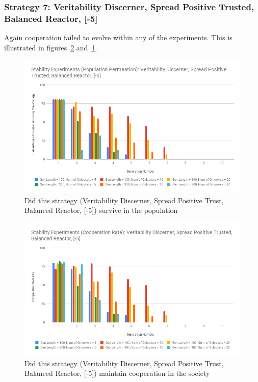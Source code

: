 \documentclass[]{final_report}
\begin{document}
\subsubsection{Strategy 7: Veritability Discerner, Spread Positive Trusted, Balanced Reactor, [-5]} 
Again cooperation failed to evolve within any of the experiments. This is illustrated in figures~\ref{fig:vdsptbr-5Coop} and~\ref{fig:vdsptbr-5Pop}.
\begin{figure}
\begin{framed}
	\includegraphics[width=\textwidth]{vdsptbr-5Pop.png}
	\caption{Did this strategy (Veritability Discerner, Spread Positive Trust, Balanced Reactor, [-5]) survive in the population}
	\label{fig:vdsptbr-5Pop}
\end{framed}
\end{figure}
\begin{figure}
\begin{framed}
	\includegraphics[width=\textwidth]{vdsptbr-5Coop.png}
	\caption{Did this strategy (Veritability Discerner, Spread Positive Trust, Balanced Reactor, [-5]) maintain cooperation in the society}
	\label{fig:vdsptbr-5Coop}
\end{framed}
\end{figure}
\end{document}
